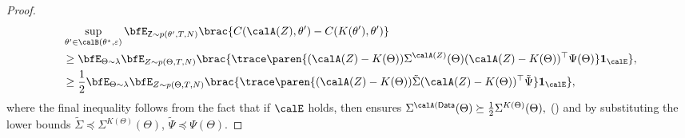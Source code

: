 \begin{proof}
\begin{align*}
    &\sup_{\theta'\in\calB(\theta^\star, \varepsilon)} \bfE_{\mathsf{Z} \sim p(\theta', T, N)} \brac{C(\calA(Z), \theta') -C(K(\theta'), \theta') } \\
    &\geq  \bfE_{\Theta \sim \lambda} \bfE_{Z\sim p(\Theta, T, N)} \brac{ \trace\paren{(\calA(Z)  - K(\Theta)) \Sigma^{\calA(Z)}(\Theta) (\calA(Z) - K(\Theta))^\top \Psi(\Theta)} \mathbf{1}_{\calE}}, \\
    &\geq \frac{1}{2} \bfE_{\Theta \sim \lambda} \bfE_{Z \sim p(\Theta, T, N)} \brac{ \trace\paren{(\calA(Z) - K(\Theta)) \tilde \Sigma (\calA(Z) - K(\Theta))^\top \tilde \Psi} \mathbf{1}_{\calE}},
\end{align*}
where the final inequality follows from the fact that if $\calE$ holds, then  ensures $\Sigma^{\calA(\mathsf{Data}}(\Theta) \succeq \frac{1}{2}\Sigma^{K(\Theta)}(\Theta),$ () and by substituting the lower bounds $\tilde \Sigma \preceq \Sigma^{K(\Theta)}(\Theta)$, $\tilde \Psi \preceq \Psi(\Theta)$. 


\end{proof}
